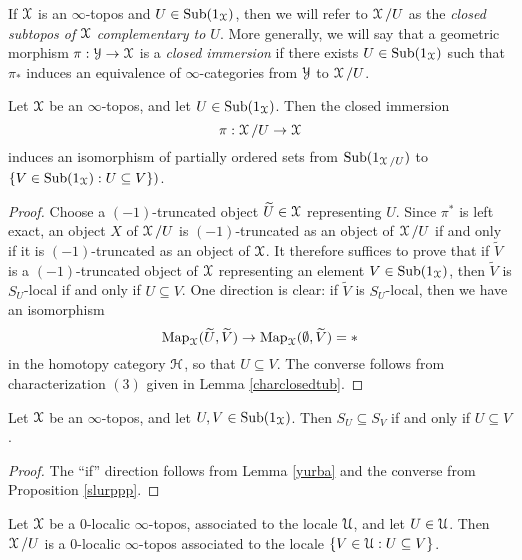 \begin{definition}
If $\operatorname{\mathcal{X}}$ is an $\infty$-topos and $U \in \operatorname{Sub}(1_{\operatorname{\mathcal{X}}})$, then we will refer to 
 $\operatorname{\mathcal{X}}/U$ as the {\it closed subtopos of $\operatorname{\mathcal{X}}$ complementary to $U$}. More generally, we will say that a geometric morphism $\pi: \operatorname{\mathcal{Y}} \rightarrow \operatorname{\mathcal{X}}$ is a {\it closed immersion} if
there exists $U \in \operatorname{Sub}(1_{\operatorname{\mathcal{X}}})$ such that $\pi_{\ast}$ induces an equivalence of $\infty$-categories from $\operatorname{\mathcal{Y}}$ to $\operatorname{\mathcal{X}}/U$.
\end{definition}

\begin{proposition}\label{slurppp}
Let $\operatorname{\mathcal{X}}$ be an $\infty$-topos, and let $U \in \operatorname{Sub}(1_{\operatorname{\mathcal{X}}})$. Then the closed immersion
$$ \pi: \operatorname{\mathcal{X}}/U \rightarrow \operatorname{\mathcal{X}}$$ induces an isomorphism of partially ordered sets from
$\operatorname{Sub}( 1_{\operatorname{\mathcal{X}}/U})$ to $\{ V \in \operatorname{Sub}(1_{\operatorname{\mathcal{X}}}): U \subseteq V\} )$.
\end{proposition}

\begin{proof}
Choose a $(-1)$-truncated object $\widetilde{U} \in \operatorname{\mathcal{X}}$ representing $U$.
Since $\pi^{\ast}$ is left exact, an object $X$ of $\operatorname{\mathcal{X}}/U$ is $(-1)$-truncated as an object of $\operatorname{\mathcal{X}}/U$ if and only if it is $(-1)$-truncated as an object of $\operatorname{\mathcal{X}}$. It therefore suffices to prove that
if $\widetilde{V}$ is a $(-1)$-truncated object of $\operatorname{\mathcal{X}}$ representing an element $V \in \operatorname{Sub}(1_{\operatorname{\mathcal{X}}})$, then $\widetilde{V}$ is $S_{U}$-local if and only if $U \subseteq V$. One direction is clear: if $\widetilde{V}$ is $S_U$-local, then we have an isomorphism
$$ \operatorname{{Map}}_{\operatorname{\mathcal{X}}}( \widetilde{U}, \widetilde{V} ) \rightarrow \operatorname{{Map}}_{\operatorname{\mathcal{X}}}( \emptyset, \widetilde{V}) = \ast$$
in the homotopy category $\operatorname{\mathcal{H}}$, so that $U \subseteq V$. The converse follows from characterization $(3)$ given in Lemma \ref{charclosedtub}.
\end{proof}

\begin{corollary}
Let $\operatorname{\mathcal{X}}$ be an $\infty$-topos, and let $U,V \in \operatorname{Sub}(1_{\operatorname{\mathcal{X}}})$. Then $S_{U} \subseteq S_{V}$ if and only if $U \subseteq V$.
\end{corollary}

\begin{proof}
The ``if'' direction follows from Lemma \ref{yurba} and the converse from Proposition \ref{slurppp}.
\end{proof}

\begin{corollary}\label{glad1}
Let $\operatorname{\mathcal{X}}$ be a $0$-localic $\infty$-topos, associated to the locale $\operatorname{\mathcal{U}}$, and let
$U \in \operatorname{\mathcal{U}}$. Then $\operatorname{\mathcal{X}}/U$ is a $0$-localic $\infty$-topos
associated to the locale $\{ V \in \operatorname{\mathcal{U}}: U \subseteq V \}$.
\end{corollary}

